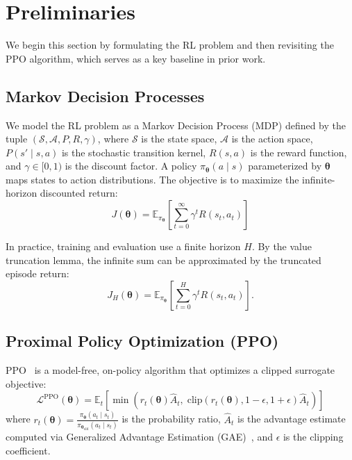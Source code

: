 \documentclass[11pt,a4paper]{article}
\newcommand{\E}{\mathbb{E}}
\newcommand{\cA}{\mathcal{A}}
\newcommand{\cS}{\mathcal{S}}
\newcommand{\cL}{\mathcal{L}}
\newcommand{\btheta}{\bm{\theta}}
\begin{document}
\section{Preliminaries}
\label{sec:preliminaries}
We begin this section by formulating the RL problem and then revisiting the PPO algorithm, which serves as a key baseline in prior work.
\subsection{Markov Decision Processes}
\label{sec:mdp}

We model the RL problem as a Markov Decision Process (MDP) defined by the tuple $(\cS, \cA, P, R, \gamma)$, where $\cS$ is the state space, $\cA$ is the action space, $P(s' \mid s, a)$ is the stochastic transition kernel, $R(s, a)$ is the reward function, and $\gamma \in [0, 1)$ is the discount factor. A policy $\pi_{\btheta}(a \mid s)$ parameterized by $\btheta$ maps states to action distributions. The objective is to maximize the infinite-horizon discounted return:
\begin{equation}
  J(\btheta) = \E_{\pi_{\btheta}}\left[\sum_{t=0}^{\infty} \gamma^t R(s_t, a_t)\right]
  \label{eq:objective}
\end{equation}

In practice, training and evaluation use a finite horizon $H$. By the value truncation lemma, the infinite sum can be approximated by the truncated episode return:
\begin{equation}
  J_H(\btheta) = \E_{\pi_{\btheta}}\left[\sum_{t=0}^{H} \gamma^t R(s_t, a_t)\right].
  \label{eq:truncated_objective}
\end{equation}

\subsection{Proximal Policy Optimization (PPO)}
\label{sec:ppo}

PPO~\cite{schulman2017ppo} is a model-free, on-policy algorithm that optimizes a clipped surrogate objective:
\begin{equation}
  \cL^{\text{PPO}}(\btheta) = \E_t\left[\min\left(r_t(\btheta) \hat{A}_t, \; \text{clip}\left(r_t(\btheta), 1-\epsilon, 1+\epsilon\right) \hat{A}_t\right)\right]
  \label{eq:ppo_loss}
\end{equation}
where $r_t(\btheta) = \frac{\pi_{\btheta}(a_t \mid s_t)}{\pi_{\btheta_{\text{old}}}(a_t \mid s_t)}$ is the probability ratio, $\hat{A}_t$ is the advantage estimate computed via Generalized Advantage Estimation (GAE)~\cite{schulman2016gae}, and $\epsilon$ is the clipping coefficient.
\end{document}
